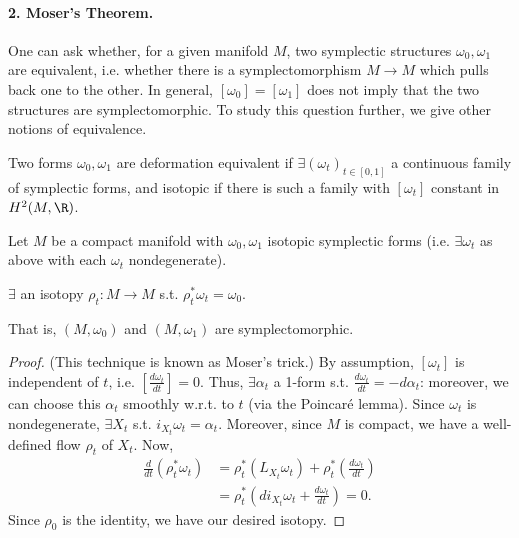 
\paragraph{2. Moser's Theorem.}
One can ask whether, for a given manifold $M$, two symplectic structures $\omega_0,\omega_1$ are equivalent, i.e. whether there is a symplectomorphism $M\to M$ which pulls back one to the other. In general, $[\omega_0]=[\omega_1]$ does not imply that the two structures are symplectomorphic. To study this question further, we give other notions of equivalence.
\begin{definition}[2]
Two forms $\omega_0,\omega_1$ are deformation equivalent if $\exists(\omega_t)_{t\in[0,1]}$ a continuous family of symplectic forms, and isotopic if there is such a family with $[\omega_t]$ constant in $H^2(M,\R)$.
\end{definition}
Let $M$ be a compact manifold with $\omega_0,\omega_1$ isotopic symplectic forms (i.e. $\exists\omega_t$ as above with each $\omega_t$ nondegenerate).
\begin{theorem}[1: Moser]
$\exists$ an isotopy $\rho_t:M\to M$ s.t. $\rho_t^*\omega_t=\omega_0$.
\end{theorem}
That is, $(M,\omega_0)$ and $(M,\omega_1)$ are symplectomorphic.
\begin{proof}
(This technique is known as Moser's trick.) By assumption, $[\omega_t]$ is independent of $t$, i.e. $[\frac{d\omega_t}{dt}]=0$. Thus, $\exists\alpha_t$ a 1-form s.t. $\frac{d\omega_t}{dt}=-d\alpha_t$: moreover, we can choose this $\alpha_t$ smoothly w.r.t. to $t$ (via the Poincaré lemma). Since $\omega_t$ is nondegenerate, $\exists X_t$ s.t. $i_{X_t}\omega_t=\alpha_t$. Moreover, since $M$ is compact, we have a well-defined flow $\rho_t$ of $X_t$. Now,
\begin{align*}
\frac{d}{dt}(\rho_t^*\omega_t)
&=\rho_t^*(L_{X_t}\omega_t)+\rho_t^*\left(\frac{d\omega_t}{dt}\right)\\
&=\rho_t^*\left(di_{X_t}\omega_t+\frac{d\omega_t}{dt}\right)=0.
\end{align*}
Since $\rho_0$ is the identity, we have our desired isotopy.
\end{proof}

